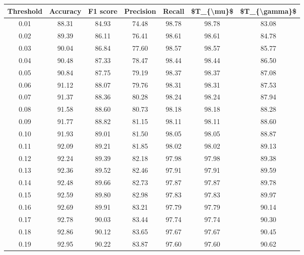 \begin{tabular}{|c|c|c|c|c|c|c|}
\hline
 Threshold &  Accuracy &  F1 score &  Precision &  Recall &  \$T\_\{\textbackslash mu\}\$ &  \$T\_\{\textbackslash gamma\}\$ \\
\hline
      0.01 &     88.31 &     84.93 &      74.48 &   98.78 &      98.78 &         83.08 \\
      0.02 &     89.39 &     86.11 &      76.41 &   98.61 &      98.61 &         84.78 \\
      0.03 &     90.04 &     86.84 &      77.60 &   98.57 &      98.57 &         85.77 \\
      0.04 &     90.48 &     87.33 &      78.47 &   98.44 &      98.44 &         86.50 \\
      0.05 &     90.84 &     87.75 &      79.19 &   98.37 &      98.37 &         87.08 \\
      0.06 &     91.12 &     88.07 &      79.76 &   98.31 &      98.31 &         87.53 \\
      0.07 &     91.37 &     88.36 &      80.28 &   98.24 &      98.24 &         87.94 \\
      0.08 &     91.58 &     88.60 &      80.73 &   98.18 &      98.18 &         88.28 \\
      0.09 &     91.77 &     88.82 &      81.15 &   98.11 &      98.11 &         88.60 \\
      0.10 &     91.93 &     89.01 &      81.50 &   98.05 &      98.05 &         88.87 \\
      0.11 &     92.09 &     89.21 &      81.85 &   98.02 &      98.02 &         89.13 \\
      0.12 &     92.24 &     89.39 &      82.18 &   97.98 &      97.98 &         89.38 \\
      0.13 &     92.36 &     89.52 &      82.46 &   97.91 &      97.91 &         89.59 \\
      0.14 &     92.48 &     89.66 &      82.73 &   97.87 &      97.87 &         89.78 \\
      0.15 &     92.59 &     89.80 &      82.98 &   97.83 &      97.83 &         89.97 \\
      0.16 &     92.69 &     89.91 &      83.21 &   97.79 &      97.79 &         90.14 \\
      0.17 &     92.78 &     90.03 &      83.44 &   97.74 &      97.74 &         90.30 \\
      0.18 &     92.86 &     90.12 &      83.65 &   97.67 &      97.67 &         90.45 \\
      0.19 &     92.95 &     90.22 &      83.87 &   97.60 &      97.60 &         90.62 \\

\end{tabular}
